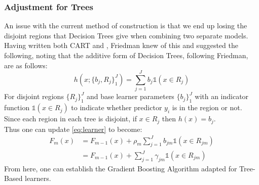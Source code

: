 \documentclass[11pt,a4paper]{report}
\begin{document}
\subsubsection{Adjustment for Trees}
An issue with the current method of construction is that we end up losing the disjoint regions that Decision Trees give when combining two separate models. 
Having written both CART \cite{tree} and \cite{gbm}, Friedman knew of this and suggested the following, noting that the additive form of Decision Trees, following Friedman, are as follows:
\[
h(x;\{b_j,R_j\}_{1}^{J}) = \sum_{j=1}^{J} b_j \mathds{1} (x \in R_j )
\]
For disjoint regions $\{R_j\}_{1}^{J}$ and base learner parameters $\{b_j\}_{1}^{J}$ with an indicator function $\mathds{1} (x \in R_j)$ to indicate whether predictor $y_i$ is in the region or not.
Since each region in each tree is disjoint, if $x \in R_j$ then $h(x) = b_j$.\\
Thus one can update \ref{eq:learner} to become:
\begin{equation}
\begin{split}
    F_m (x) &= F_{m-1} (x) + \rho_m \sum_{j=1}^{J} b_{jm} \mathds{1}(x \in R_{jm}) \\
    &= F_{m-1} (x) + \sum_{j=1}^{J} \gamma_{jm} \mathds{1}(x \in R_{jm})
\end{split}
\end{equation}
From here, one can establish the Gradient Boosting Algorithm adapted for Tree-Based learners.
\end{document}
